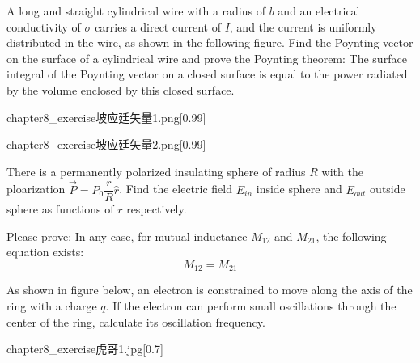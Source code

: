 \begin{example}
    A long and straight cylindrical wire with a radius of \(b \) and an electrical conductivity of \(\sigma \) carries a direct current of \(I \), and the current is uniformly distributed 
    in the wire, as shown in the following figure. Find the Poynting vector on the surface of a cylindrical wire and prove the Poynting theorem: The surface integral of the Poynting vector 
    on a closed surface is equal to the power radiated by the volume enclosed by this closed surface.
    
    \begin{minipage}{0.45\textwidth}
        \centering
        \begin{singlefigure}[a]{chapter8_exercise坡应廷矢量1.png}[0.99]
        \end{singlefigure}
    \end{minipage}
    \begin{minipage}{0.45\textwidth}
        \centering  
        \begin{singlefigure}[b]{chapter8_exercise坡应廷矢量2.png}[0.99]
        \end{singlefigure}
    \end{minipage}
\end{example}

\begin{example}
    There is a permanently polarized insulating sphere of radius \( R \) with the ploarization \( \vec{P} = P_0 \dfrac{r}{R}\hat{r} \).
    Find the electric field \( E_{in} \) inside sphere and \( E_{out} \) outside sphere as functions of \( r \) respectively.
\end{example}

\begin{example}
    Please prove: In any case, for mutual inductance \(M_{12} \) and \(M_{21}\), the following equation exists: 
    \[M_{12} = M_{21}\]
\end{example}

\begin{example}
    As shown in figure below, an electron is constrained to move along the axis of the ring with a charge \( q \). If the 
    electron can perform small oscillations through the center of the ring, calculate its oscillation frequency.
    \begin{singlefigure}{chapter8_exercise虎哥1.jpg}[0.7]
    \end{singlefigure}
\end{example}

